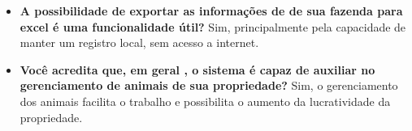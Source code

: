 \begin{apendicesenv}
\begin{itemize}
	\item \textbf{A possibilidade de exportar as informações de de sua fazenda para excel é uma funcionalidade útil?}
	Sim, principalmente pela capacidade de manter um registro local, sem acesso a internet.

	\item \textbf{Você acredita que, em geral , o sistema é capaz de auxiliar no gerenciamento de animais de sua propriedade?}
	Sim, o gerenciamento dos animais facilita o trabalho e possibilita o aumento da lucratividade da propriedade.

\end{itemize}


\end{apendicesenv}
